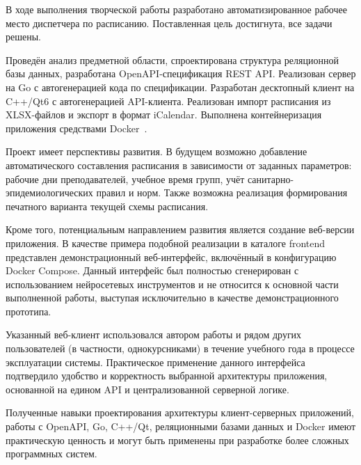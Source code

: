 \Conclusion

В ходе выполнения творческой работы разработано автоматизированное рабочее место диспетчера по расписанию. Поставленная цель достигнута, все задачи решены.

Проведён анализ предметной области, спроектирована структура реляционной базы данных, разработана OpenAPI-спецификация REST API. Реализован сервер на Go с автогенерацией кода по спецификации. Разработан десктопный клиент на C++/Qt6 с автогенерацией API-клиента. Реализован импорт расписания из XLSX-файлов и экспорт в формат iCalendar. Выполнена контейнеризация приложения средствами Docker~\cite{docker:doc}.

Проект имеет перспективы развития. В будущем возможно добавление автоматического составления расписания в зависимости от заданных параметров: рабочие дни преподавателей, учебное время групп, учёт санитарно-эпидемиологических правил и норм. Также возможна реализация формирования печатного варианта текущей схемы расписания.

Кроме того, потенциальным направлением развития является создание веб-версии приложения. В качестве примера подобной реализации в каталоге frontend представлен демонстрационный веб-интерфейс, включённый в конфигурацию Docker Compose. Данный интерфейс был полностью сгенерирован с использованием нейросетевых инструментов и не относится к основной части выполненной работы, выступая исключительно в качестве демонстрационного прототипа.

Указанный веб-клиент использовался автором работы и рядом других пользователей (в частности, однокурсниками) в течение учебного года в процессе эксплуатации системы. Практическое применение данного интерфейса подтвердило удобство и корректность выбранной архитектуры приложения, основанной на едином API и централизованной серверной логике.

Полученные навыки проектирования архитектуры клиент-серверных приложений, работы с OpenAPI, Go, C++/Qt, реляционными базами данных и Docker имеют практическую ценность и могут быть применены при разработке более сложных программных систем.
